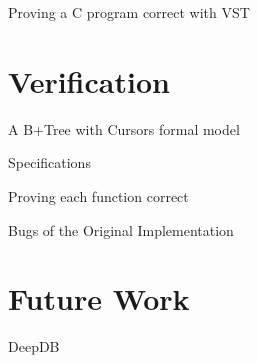 \documentclass[page number,usenames,dvipsnames]{beamer}
\begin{document}
\begin{frame}{Proving a C program correct with VST}

  
\end{frame}

\section{Verification}
\begin{frame}{A B+Tree with Cursors formal model}

  
\end{frame}

\begin{frame}{Specifications}

\end{frame}

\begin{frame}{Proving each function correct}


\end{frame}

\begin{frame}{Bugs of the Original Implementation}
  
\end{frame}

\section{Future Work}
\begin{frame}{DeepDB}

\end{frame}
  
\end{document}
